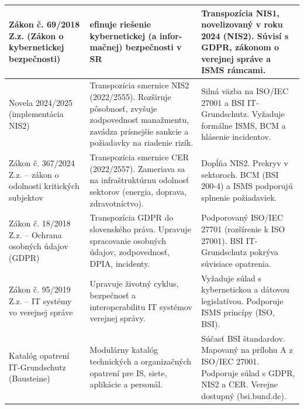 \documentclass[12pt,a4paper]{article}
\begin{document}
{\begin{table}
\begin{tabular}{|p{5cm}|p{8cm}|p{7cm}|}
    Zákon č. 69/2018 Z.z. (Zákon o kybernetickej bezpečnosti) & efinuje riešenie kybernetickej (a infor-
mačnej) bezpečnosti v SR  & Transpozícia NIS1, novelizovaný v roku 2024 (NIS2). Súvisí s GDPR, zákonom o verejnej správe a ISMS rámcami. \\ \hline


    
    Novela 2024/2025 (implementácia NIS2) & Transpozícia smernice NIS2 (2022/2555). Rozširuje pôsobnosť, zvyšuje zodpovednosť manažmentu, zavádza prísnejšie sankcie a požiadavky na riadenie rizík. & Silná väzba na ISO/IEC 27001 a BSI IT-Grundschutz. Vyžaduje formálne ISMS, BCM a hlásenie incidentov. \\ \hline
    
    Zákon č. 367/2024 Z.z. – zákon o odolnosti kritických subjektov & Transpozícia smernice CER (2022/2557). Zameriava sa na infraštruktúrnu odolnosť sektorov (energia, doprava, zdravotníctvo). & Dopĺňa NIS2. Prekryv v sektoroch. BCM (BSI 200-4) a ISMS podporujú splnenie požiadaviek. \\ \hline
    
    Zákon č. 18/2018 Z.z. – Ochrana osobných údajov (GDPR) & Transpozícia GDPR do slovenského práva. Upravuje spracovanie osobných údajov, zodpovednosť, DPIA, incidenty. & Podporovaný ISO/IEC 27701 (rozšírenie k ISO 27001). BSI IT-Grundschutz pokrýva súvisiace opatrenia. \\ \hline
    
    Zákon č. 95/2019 Z.z. – IT systémy vo verejnej správe & Upravuje životný cyklus, bezpečnosť a interoperabilitu IT systémov verejnej správy. & Vyžaduje súlad s kybernetickou a dátovou legislatívou. Podporuje ISMS princípy (ISO, BSI). \\ \hline
    
    Katalóg opatrení IT-Grundschutz (Bausteine) & Modulárny katalóg technických a organizačných opatrení pre IS, siete, aplikácie a personál. & Súčasť BSI štandardov. Mapovaný na prílohu A z ISO/IEC 27001. Podporuje súlad s GDPR, NIS2 a CER. Verejne dostupný (bsi.bund.de). \\ \hline
    

\end{tabular}
\end{table}}
\end{document}
